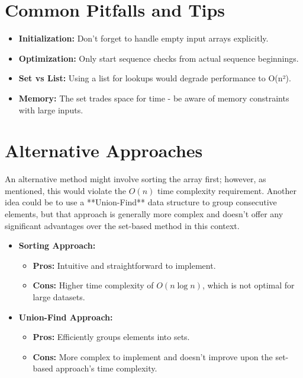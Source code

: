 \section*{Common Pitfalls and Tips}
\begin{itemize}
    \item \textbf{Initialization:} Don't forget to handle empty input arrays explicitly.
    \item \textbf{Optimization:} Only start sequence checks from actual sequence beginnings.
    \item \textbf{Set vs List:} Using a list for lookups would degrade performance to O(n²).
    \item \textbf{Memory:} The set trades space for time - be aware of memory constraints with large inputs.
\end{itemize}

\section*{Alternative Approaches}
An alternative method might involve sorting the array first; however, as mentioned, this would violate the \(O(n)\) time complexity requirement. Another idea could be to use a **Union-Find** data structure to group consecutive elements, but that approach is generally more complex and doesn't offer any significant advantages over the set-based method in this context.

\begin{itemize}
	\item \textbf{Sorting Approach:}
	\begin{itemize}
		\item \textbf{Pros:} Intuitive and straightforward to implement.
		\item \textbf{Cons:} Higher time complexity of \(O(n \log n)\), which is not optimal for large datasets.
	\end{itemize}
	
	\item \textbf{Union-Find Approach:}
	\begin{itemize}
		\item \textbf{Pros:} Efficiently groups elements into sets.
		\item \textbf{Cons:} More complex to implement and doesn't improve upon the set-based approach's time complexity.
	\end{itemize}
\end{itemize}


